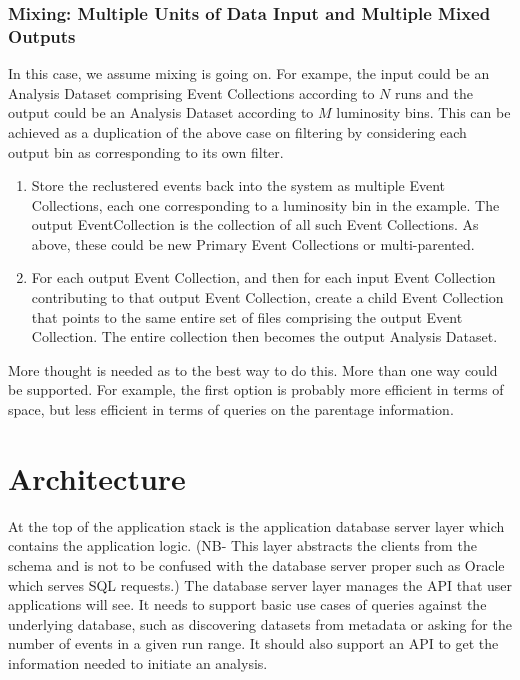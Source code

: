 \documentclass{cmspaper}
\begin{document}
\subsubsection{Mixing: Multiple Units of Data Input and Multiple Mixed Outputs}

In this case, we assume mixing is going on.  For exampe, the input could be 
an Analysis Dataset comprising Event Collections according to $N$ runs and the 
output could be an Analysis Dataset according to $M$ luminosity bins.  This 
can be achieved as a duplication of the above case on filtering by 
considering each output bin as corresponding to its own filter.  
\begin{enumerate}
\item Store the reclustered events back into the system as multiple 
Event Collections, each one corresponding to a luminosity bin in the example. 
The output EventCollection is the collection of all such Event Collections.
As above, these could be new Primary Event Collections or multi-parented.
\item For each output Event Collection, and then for each input Event Collection
contributing to that output Event Collection, create a child Event Collection 
that points to the same entire set of files comprising the output Event Collection.
The entire collection then becomes the output Analysis Dataset.  
\end{enumerate}
More thought is needed as to the best way to do this.  More than one way could be 
supported.  For example, the first option is probably more efficient in terms of 
space, but less efficient in terms of queries on the parentage information.

\section{Architecture}


At the top of the application stack is the application database server layer which contains
the application logic.  (NB- This layer abstracts the clients from the schema and is not 
to be confused with the database server proper such as Oracle which serves SQL requests.) 
The database server layer manages the API that user applications will see.  It needs to 
support basic use cases of queries against the underlying database, such as discovering 
datasets from metadata or asking for the number of events in a given run range.  It 
should also support an API to get the information needed to initiate an analysis.  
\end{document}
